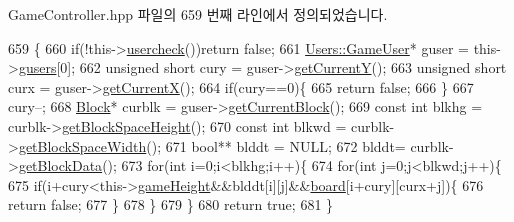Game\+Controller.\+hpp 파일의 659 번째 라인에서 정의되었습니다.


\begin{DoxyCode}
659                               \{
660                 \textcolor{keywordflow}{if}(!this->\hyperlink{class_tetris_1_1_game_controller_ab96e22daad51119b35cbee8cfb7385ef}{usercheck}())\textcolor{keywordflow}{return} \textcolor{keyword}{false};
661                 \hyperlink{class_tetris_1_1_users_1_1_game_user}{Users::GameUser}* guser = this->\hyperlink{class_tetris_1_1_game_controller_a1a31d3a933daad6d95e20458eea2900e}{gusers}[0];
662                 \textcolor{keywordtype}{unsigned} \textcolor{keywordtype}{short} cury = guser->\hyperlink{class_tetris_1_1_users_1_1_game_user_af5bd7ff0b575af1b42b093488cff97e2}{getCurrentY}();
663                 \textcolor{keywordtype}{unsigned} \textcolor{keywordtype}{short} curx = guser->\hyperlink{class_tetris_1_1_users_1_1_game_user_ad25eace96bd27ae6df4a0c0d506be730}{getCurrentX}();
664                 \textcolor{keywordflow}{if}(cury==0)\{
665                     \textcolor{keywordflow}{return} \textcolor{keyword}{false};
666                 \}
667                 cury--;
668                 \hyperlink{class_tetris_1_1_block}{Block}* curblk = guser->\hyperlink{class_tetris_1_1_users_1_1_game_user_a3d4bcc74d518c28356012f8a42b85896}{getCurrentBlock}();
669                 \textcolor{keyword}{const} \textcolor{keywordtype}{int} blkhg = curblk->\hyperlink{class_tetris_1_1_block_a5301977e32c03aaf122fa289fcba77ba}{getBlockSpaceHeight}();
670                 \textcolor{keyword}{const} \textcolor{keywordtype}{int} blkwd = curblk->\hyperlink{class_tetris_1_1_block_ac390e14de476582300d815d9054ed9bd}{getBlockSpaceWidth}();
671                 \textcolor{keywordtype}{bool}** blddt = NULL;
672                 blddt= curblk->\hyperlink{class_tetris_1_1_block_a9bd2c3d6ccacff9a5f56f72336ba324f}{getBlockData}();
673                 \textcolor{keywordflow}{for}(\textcolor{keywordtype}{int} i=0;i<blkhg;i++)\{
674                     \textcolor{keywordflow}{for}(\textcolor{keywordtype}{int} j=0;j<blkwd;j++)\{
675                         \textcolor{keywordflow}{if}(i+cury<this->\hyperlink{class_tetris_1_1_game_controller_a8e3adc647ed382de0ff541417bea9b33}{gameHeight}&&blddt[i][j]&&\hyperlink{class_tetris_1_1_game_controller_a7725b6cec9459a6bffaa3e29dd1c5196}{board}[i+cury][curx+j])\{
676                             \textcolor{keywordflow}{return} \textcolor{keyword}{false};
677                         \}
678                     \}
679                 \}
680                 \textcolor{keywordflow}{return} \textcolor{keyword}{true};
681             \}
\end{DoxyCode}
